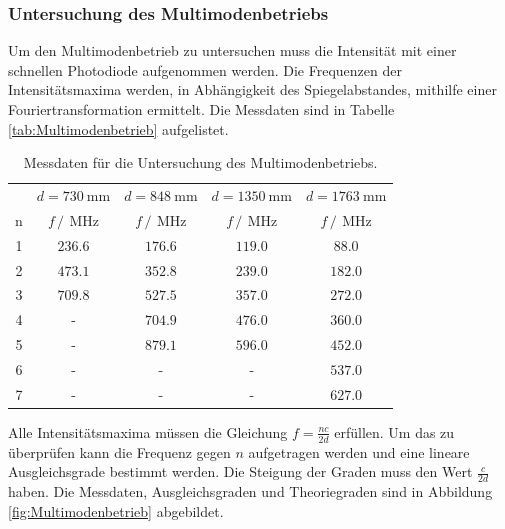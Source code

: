 \subsubsection{Untersuchung des Multimodenbetriebs}
Um den Multimodenbetrieb zu untersuchen muss die Intensität mit einer schnellen Photodiode aufgenommen werden. Die 
Frequenzen der Intensitätsmaxima werden, in Abhängigkeit des Spiegelabstandes, mithilfe einer Fouriertransformation ermittelt. 
Die Messdaten sind in Tabelle \ref{tab:Multimodenbetrieb} aufgelistet.
\FloatBarrier
\begin{table}
  \centering
  \caption{Messdaten für die Untersuchung des Multimodenbetriebs.}
  \begin{tabular}{c c c c c}
    \toprule
    &$d=\SI{730}{\milli\meter}$&$d=\SI{848}{\milli\meter}$&$d=\SI{1350}{\milli\meter}$&$d=\SI{1763}{\milli\meter}$\\
    n&$f\,/\,\SI{}{\mega\hertz}$&$f\,/\,\SI{}{\mega\hertz}$&$f\,/\,\SI{}{\mega\hertz}$&$f\,/\,\SI{}{\mega\hertz}$\\
    \midrule
    1&$\num{236.6}$&$\num{176.6}$&$\num{119.0}$&$\num{88.0}$\\
    2&$\num{473.1}$&$\num{352.8}$&$\num{239.0}$&$\num{182.0}$\\
    3&$\num{709.8}$&$\num{527.5}$&$\num{357.0}$&$\num{272.0}$\\
    4&-&$\num{704.9}$&$\num{476.0}$&$\num{360.0}$\\
    5&-&$\num{879.1}$&$\num{596.0}$&$\num{452.0}$\\
    6&-&-&-&$\num{537.0}$\\
    7&-&-&-&$\num{627.0}$\\
  \end{tabular}
\end{table}
\FloatBarrier
Alle Intensitätsmaxima müssen die Gleichung $f = \frac{nc}{2d}$ erfüllen. Um das zu überprüfen kann die 
Frequenz gegen $n$ aufgetragen werden und eine lineare Ausgleichsgrade bestimmt werden. Die Steigung der 
Graden muss den Wert $\frac{c}{2d}$ haben.
Die Messdaten, Ausgleichsgraden und Theoriegraden sind in Abbildung \ref{fig:Multimodenbetrieb} abgebildet.
\FloatBarrier
